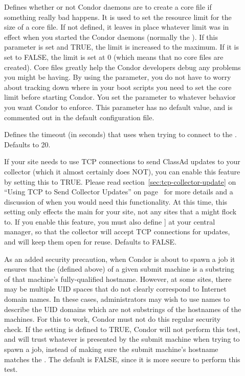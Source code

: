 \begin{description}
\item[] \label{param:CreateCoreFiles}
  Defines whether or not Condor daemons are to
  create a core file if something really bad happens.  It is
  used to set
  the resource limit for the size of a core file.  If not defined,
  it leaves in place whatever limit was in effect
  when you started the Condor daemons (normally the ).
  If this parameter is set and TRUE, the limit is increased to
  the maximum.  If it is set to FALSE, the limit is set at 0
  (which means that no core files are created).  Core files
  greatly help the Condor developers debug any problems you might be
  having.  By using the parameter, you do not have to worry about
  tracking down where in your boot scripts you need to set the core
  limit before starting Condor. You set the parameter
  to whatever behavior you want Condor to enforce.  This parameter has
  no default value, and is commented out in the default configuration file. 

\item[] \label{param:QQueryTimeout}
  Defines the timeout (in seconds) that  uses when trying to
  connect to the .  Defaults to 20.

\item[]
  \label{param:UpdateCollectorWithTcp}
  If your site needs to use TCP connections to send ClassAd updates to
  your collector (which it almost certainly does NOT), you can enable
  this feature by setting this to TRUE.
  Please read section~\ref{sec:tcp-collector-update} on ``Using TCP to
  Send Collector Updates'' on page~\pageref{sec:tcp-collector-update}
  for more details and a discussion of when you would need this
  functionality. 
  At this time, this setting only effects the main 
  for your site, not any sites that a  might flock to. 
  If you enable this feature, you must also define
  ] at your central manager, so
  that the collector will accept TCP connections for updates, and will
  keep them open for reuse.
  Defaults to FALSE.

\item[]
  \label{param:TrustUidDomain}
  As an added security precaution, when Condor is about to spawn a job
  it ensures that the  (defined above) of a given
  submit machine is a substring of that machine's fully-qualified
  hostname.
  However, at some sites, there may be multiple UID spaces that do
  not clearly correspond to Internet domain names.
  In these cases, administrators may wish to use names to describe the
  UID domains which are not substrings of the hostnames of the
  machines.
  For this to work, Condor must not do this regular security check.
  If the  setting is defined to TRUE,
  Condor will not perform this test, and will trust whatever
   is presented by the submit machine when trying
  to spawn a job, instead of making sure the submit machine's hostname
  matches the .
  The default is FALSE, since it is more secure to perform this test. 


\end{description}

